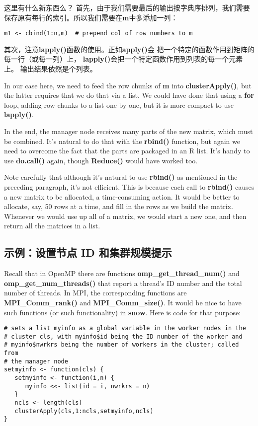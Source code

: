 这里有什么新东西么？
首先，由于我们需要最后的输出按字典序排列，我们需要
保存原有每行的索引。所以我们需要在{\bf m}中多添加一列：

\begin{lstlisting}
m1 <- cbind(1:n,m)  # prepend col of row numbers to m
\end{lstlisting}

其次，注意{\bf lapply()}函数的使用。正如{\bf apply()}会
把一个特定的函数作用到矩阵的每一行（或每一列）上，
{\bf lapply()}会把一个特定函数作用到列表的每一个元素上。
输出结果依然是个列表。

In our case here, we need to feed the row chunks of {\bf m} into {\bf
clusterApply()}, but the latter requires that we do that via a list.
We could have done that using a {\bf for} loop, adding row chunks to a
list one by one, but it is more compact to use {\bf lapply()}.

In the end, the manager node receives many parts of the new matrix,
which must be combined.  It's natural to do that with the {\bf rbind()}
function, but again we need to overcome the fact that the parts are
packaged in an R list.  It's handy to use {\bf do.call()} again, though
{\bf Reduce()} would have worked too.

Note carefully that although it's natural to use {\bf rbind()} as
mentioned in the preceding paragraph, it's not efficient.  This is
because each call to {\bf rbind()} causes a new matrix to be allocated,
a time-consuming action.  It would be better to allocate, say, 50 rows
at a time, and fill in the rows as we build the matrix.  Whenever we
would use up all of a matrix, we would start a new one, and then return
all the matrices in a list.

\subsection{示例：设置节点 ID 和集群规模提示}

Recall that in OpenMP there are functions {\bf omp\_get\_thread\_num()}
and {\bf omp\_get\_num\_threads()} that report a thread's ID number and
the total number of threads.  In MPI, the corresponding functions are
{\bf MPI\_Comm\_rank()} and {\bf MPI\_Comm\_size()}.  It would be nice
to have such functions (or such functionality) in {\bf snow}.  Here is
code for that purpose:

\begin{lstlisting}
# sets a list myinfo as a global variable in the worker nodes in the
# cluster cls, with myinfo$id being the ID number of the worker and
# myinfo$nwrkrs being the number of workers in the cluster; called from
# the manager node
setmyinfo <- function(cls) {
   setmyinfo <- function(i,n) {
      myinfo <<- list(id = i, nwrkrs = n)
   }
   ncls <- length(cls)
   clusterApply(cls,1:ncls,setmyinfo,ncls)
}
\end{lstlisting}

